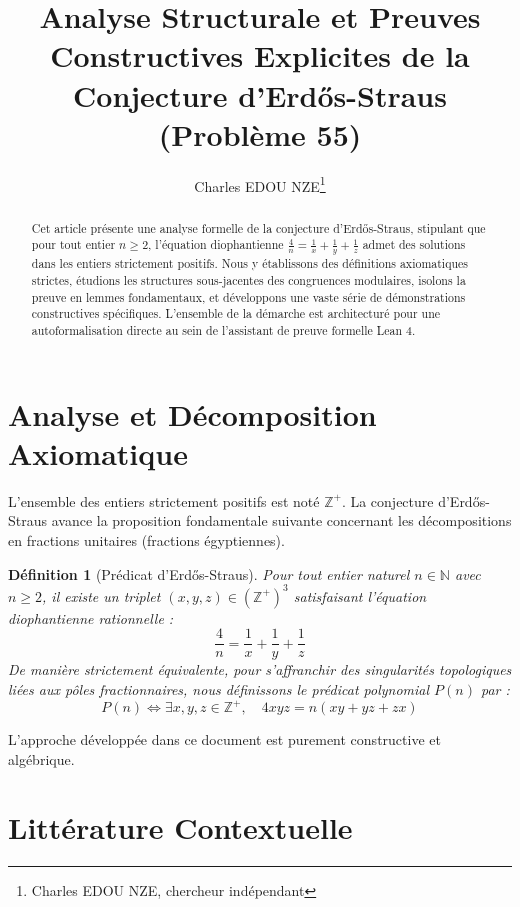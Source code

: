 \documentclass[11pt,a4paper]{article}
\title{Analyse Structurale et Preuves Constructives Explicites de la Conjecture d'Erd\H{o}s-Straus (Problème 55)}
\author{Charles EDOU NZE\thanks{Charles EDOU NZE, chercheur indépendant}}
\date{}
\newtheorem{definition}[theorem]{Définition}
\begin{document}
\maketitle

\begin{abstract}
Cet article présente une analyse formelle de la conjecture d'Erd\H{o}s-Straus, stipulant que pour tout entier $n \ge 2$, l'équation diophantienne $\frac{4}{n} = \frac{1}{x} + \frac{1}{y} + \frac{1}{z}$ admet des solutions dans les entiers strictement positifs. Nous y établissons des définitions axiomatiques strictes, étudions les structures sous-jacentes des congruences modulaires, isolons la preuve en lemmes fondamentaux, et développons une vaste série de démonstrations constructives spécifiques. L'ensemble de la démarche est architecturé pour une autoformalisation directe au sein de l'assistant de preuve formelle Lean 4.
\end{abstract}

\tableofcontents
\newpage

\section{Analyse et Décomposition Axiomatique}

L'ensemble des entiers strictement positifs est noté $\mathbb{Z}^{+}$. La conjecture d'Erd\H{o}s-Straus avance la proposition fondamentale suivante concernant les décompositions en fractions unitaires (fractions égyptiennes).

\begin{definition}[Prédicat d'Erd\H{o}s-Straus]
Pour tout entier naturel $n \in \mathbb{N}$ avec $n \ge 2$, il existe un triplet $(x, y, z) \in (\mathbb{Z}^{+})^3$ satisfaisant l'équation diophantienne rationnelle :
\begin{equation}
\frac{4}{n} = \frac{1}{x} + \frac{1}{y} + \frac{1}{z}
\label{eq:erdos}
\end{equation}
De manière strictement équivalente, pour s'affranchir des singularités topologiques liées aux pôles fractionnaires, nous définissons le prédicat polynomial $P(n)$ par :
$$ P(n) \iff \exists x, y, z \in \mathbb{Z}^{+}, \quad 4xyz = n(xy + yz + zx) $$
\end{definition}

L'approche développée dans ce document est purement constructive et algébrique.

\section{Littérature Contextuelle}
\end{document}
